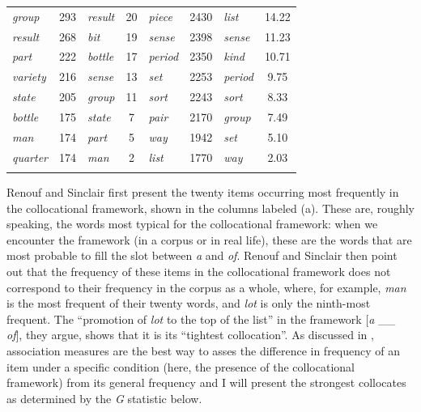 \begin{table}
{\begin{tabular}[t]{lS|lS||lS|lS}
\textit{group} & 293 & \textit{result} & 20 & \textit{piece} & 2430 & \textit{list} & 14.22 \\
\textit{result} & 268 & \textit{bit} & 19 & \textit{sense} & 2398 & \textit{sense} & 11.23 \\
\textit{part} & 222 & \textit{bottle} & 17 & \textit{period} & 2350 & \textit{kind} & 10.71 \\
\textit{variety} & 216 & \textit{sense} & 13 & \textit{set} & 2253 & \textit{period} & 9.75 \\
\textit{state} & 205 & \textit{group} & 11 & \textit{sort} & 2243 & \textit{sort} & 8.33 \\
\textit{bottle} & 175 & \textit{state} & 7 & \textit{pair} & 2170 & \textit{group} & 7.49 \\
\textit{man} & 174 & \textit{part} & 5 & \textit{way} & 1942 & \textit{set} & 5.10 \\
\textit{quarter} & 174 & \textit{man} & 2 & \textit{list} & 1770 & \textit{way} & 2.03 \\
\lspbottomrule
\end{tabular}}
\end{table}

Renouf and Sinclair first present the twenty items occurring most frequently in the collocational  framework,  shown in the columns labeled (a). These are, roughly speaking, the words most typical for the collocational framework: when we encounter the framework (in a corpus or in real life), these are the words that are most probable to fill the slot between \textit{a} and \textit{of}. Renouf and Sinclair then point out that the frequency  of these items in the collocational framework  does not correspond to their frequency in the corpus as a whole, where, for example, \textit{man} is the most frequent of their twenty words, and \textit{lot} is only the ninth\hyp{}most frequent. The ``promotion of \textit{lot} to the top of the list'' in the framework [\textit{a} \_\_ \textit{of}], they argue, shows that it is its ``tightest collocation''.  As discussed in , association  measures  are the best way to asses the difference in frequency  of an item under a specific condition (here, the presence of the collocational framework)  from its general frequency and I will present the strongest collocates as determined by the \emph{G} statistic  below.

